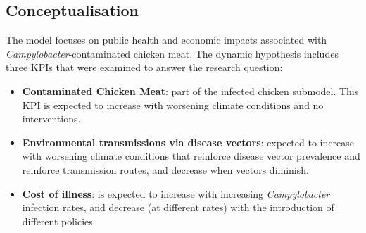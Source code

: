\subsection{Conceptualisation}
\label{s:conceptualisation}
The model focuses on public health and economic impacts associated with \textit{Campylobacter}-contaminated chicken meat. The dynamic hypothesis includes three KPIs that were examined to answer the research question: 
\begin{itemize}
    \item \textbf{Contaminated Chicken Meat}: part of the infected chicken submodel. This KPI is expected to increase with worsening climate conditions and no interventions.
    \item \textbf{Environmental transmissions via disease vectors}: expected to increase with worsening climate conditions that reinforce disease vector prevalence and reinforce transmission routes, and decrease when vectors diminish.
    \item \textbf{Cost of illness}: is expected to increase with increasing \textit{Campylobacter} infection rates, and decrease (at different rates) with the introduction of different policies.
\end{itemize}
 
